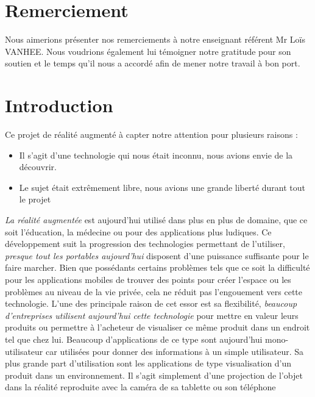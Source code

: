 \documentclass[12pt]{article}
\begin{document}
\newpage
\tableofcontents
\newpage









\section{Remerciement}

Nous aimerions présenter nos remerciements à notre enseignant référent Mr Loïs VANHEE.
Nous voudrions également lui témoigner notre gratitude pour son soutien et le
temps qu'il nous a accordé afin de mener notre travail à bon port. 
\newpage

\section{Introduction}
Ce projet de réalité augmenté à capter notre attention pour plusieurs raisons : 
\begin{itemize}
    \item Il s'agit d'une technologie qui nous était inconnu, nous avions envie de la découvrir.
    \item Le sujet était extrêmement libre, nous avions une grande liberté durant tout le projet
\end{itemize}

\medbreak
\textit{La réalité augmentée} est aujourd'hui utilisé dans plus en plus de domaine, que ce soit l'éducation, la médecine ou pour des applications plus ludiques. Ce développement suit la progression des technologies permettant de l'utiliser, \textit{presque tout les portables aujourd'hui} disposent d'une puissance suffisante pour le faire marcher. Bien que possédants certains problèmes tels que ce soit la difficulté pour les applications mobiles de trouver des points pour créer l'espace ou les problèmes au niveau de la vie privée, cela ne réduit pas l'engouement vers cette technologie. L'une des principale raison de cet essor est sa flexibilité, \textit{beaucoup d'entreprises utilisent aujourd'hui cette technologie } pour mettre en valeur leurs produits ou permettre à l'acheteur de visualiser ce même produit dans un endroit tel que chez lui.
\medbreak
Beaucoup d'applications de ce type sont aujourd'hui mono-utilisateur car utilisées pour donner des informations à un simple utilisateur. Sa plus grande part d'utilisation sont les applications de type visualisation d'un produit dans un environnement. Il s'agit simplement d'une projection de l'objet dans la réalité reproduite avec la caméra de sa tablette ou son téléphone
\end{document}
